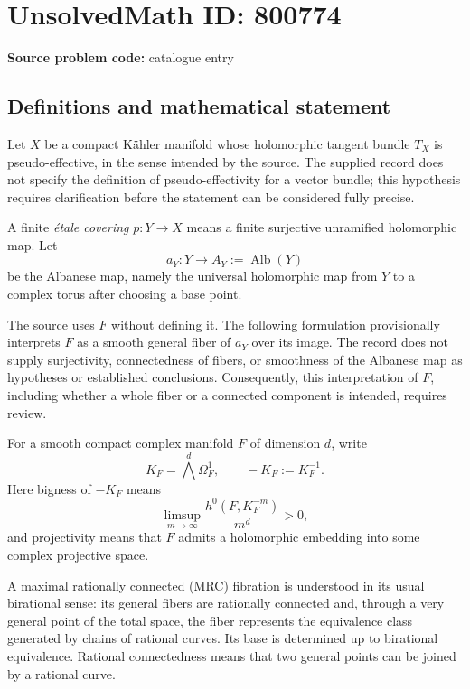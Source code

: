 \documentclass[11pt]{article}
\begin{document}
\section*{UnsolvedMath ID: 800774}
\textbf{Source problem code:} catalogue entry
\subsection{Definitions and mathematical statement}
Let \(X\) be a compact K\"ahler manifold whose holomorphic tangent bundle \(T_X\) is pseudo-effective, in the sense intended by the source. The supplied record does not specify the definition of pseudo-effectivity for a vector bundle; this hypothesis requires clarification before the statement can be considered fully precise.

A finite \emph{\'etale covering} \(p:Y\to X\) means a finite surjective unramified holomorphic map. Let
\[
a_Y:Y\longrightarrow A_Y:=\operatorname{Alb}(Y)
\]
be the Albanese map, namely the universal holomorphic map from \(Y\) to a complex torus after choosing a base point.

The source uses \(F\) without defining it. The following formulation provisionally interprets \(F\) as a smooth general fiber of \(a_Y\) over its image. The record does not supply surjectivity, connectedness of fibers, or smoothness of the Albanese map as hypotheses or established conclusions. Consequently, this interpretation of \(F\), including whether a whole fiber or a connected component is intended, requires review.

For a smooth compact complex manifold \(F\) of dimension \(d\), write
\[
K_F=\bigwedge^d\Omega_F^1,
\qquad -K_F:=K_F^{-1}.
\]
Here bigness of \(-K_F\) means
\[
\limsup_{m\to\infty}
\frac{h^0(F,K_F^{-m})}{m^d}>0,
\]
and projectivity means that \(F\) admits a holomorphic embedding into some complex projective space.

A maximal rationally connected (MRC) fibration is understood in its usual birational sense: its general fibers are rationally connected and, through a very general point of the total space, the fiber represents the equivalence class generated by chains of rational curves. Its base is determined up to birational equivalence. Rational connectedness means that two general points can be joined by a rational curve.
\end{document}

